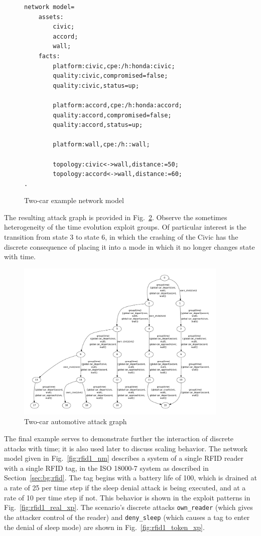 \begin{figure}
\begin{lstlisting}
network model=
    assets:
        civic;
        accord;
        wall;
    facts:
        platform:civic,cpe:/h:honda:civic;
        quality:civic,compromised=false;
        quality:civic,status=up;
        
        platform:accord,cpe:/h:honda:accord;
        quality:accord,compromised=false;
        quality:accord,status=up;

        platform:wall,cpe:/h::wall;

        topology:civic<->wall,distance:=50;
        topology:accord<->wall,distance:=60;
.
\end{lstlisting}
\caption{Two-car example network model}
\label{fig:fullbunny_two_nm}
\end{figure}

The resulting attack graph is provided in Fig.~\ref{fig:fullbunny_two_ag}.
Observe the sometimes heterogeneity of the time evolution exploit groups.
Of particular interest is the transition from state 3 to state 6, in which
the crashing of the Civic has the discrete consequence of placing it into a
mode in which it no longer changes state with time.

\begin{figure}
\centering
\includegraphics[angle=90,width=0.9\textwidth]{ag_car/twocar/full_bunny_twocar_ag_5}
\caption{Two-car automotive attack graph}
\label{fig:fullbunny_two_ag}
\end{figure}
\label{sec:rfid}
The final example serves to demonstrate further the interaction of discrete
attacks with time; it is also used later to discuss scaling behavior. The network
model given in Fig.~\ref{fig:rfid1_nm} describes a system of a single
RFID reader with a single RFID tag, in the ISO 18000-7 system as described 
in Section~\ref{sec:bg:rfid}. The tag begins with a battery life of 100, which
is drained at a rate of 25 per time step if the sleep denial attack is being
executed, and at a rate of 10 per time step if not. This behavior is shown in
the exploit patterns in Fig.~\ref{fig:rfid1_real_xp}. The scenario's discrete
attacks \texttt{own\_reader} (which gives the attacker control of
the reader) and \texttt{deny\_sleep} (which causes a tag to enter the
denial of sleep mode) are shown in Fig.~\ref{fig:rfid1_token_xp}.

